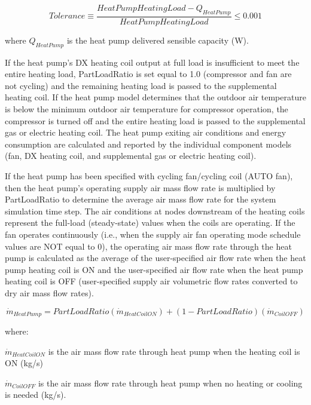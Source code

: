 \begin{equation}
  Tolerance \equiv \frac{HeatPumpHeatingLoad - Q_{HeatPump}}{HeatPumpHeatingLoad} \leq 0.001
\end{equation}

where \(Q_{HeatPump}\) is the heat pump delivered sensible capacity (W).

If the heat pump's DX heating coil output at full load is insufficient to meet the entire heating load, PartLoadRatio is set equal to 1.0 (compressor and fan are not cycling) and the remaining heating load is passed to the supplemental heating coil. If the heat pump model determines that the outdoor air temperature is below the minimum outdoor air temperature for compressor operation, the compressor is turned off and the entire heating load is passed to the supplemental gas or electric heating coil. The heat pump exiting air conditions and energy consumption are calculated and reported by the individual component models (fan, DX heating coil, and supplemental gas or electric heating coil).

If the heat pump has been specified with cycling fan/cycling coil (AUTO fan), then the heat pump's operating supply air mass flow rate is multiplied by PartLoadRatio to determine the average air mass flow rate for the system simulation time step. The air conditions at nodes downstream of the heating coils represent the full-load (steady-state) values when the coils are operating. If the fan operates continuously (i.e., when the supply air fan operating mode schedule values are NOT equal to 0), the operating air mass flow rate through the heat pump is calculated as the average of the user-specified air flow rate when the heat pump heating coil is ON and the user-specified air flow rate when the heat pump heating coil is OFF (user-specified supply air volumetric flow rates converted to dry air mass flow rates).

\begin{equation}
{\dot{m}_{HeatPump}} = PartLoadRatio\left( {\dot{m}_{HeatCoilON}} \right) + \left( {1 - PartLoadRatio} \right)\left( {\dot{m}_{CoilOFF}} \right)
\end{equation}

where:

\({\dot{m}_{HeatCoilON}}\) is the air mass flow rate through heat pump when the heating coil is ON (kg/s)

\({\dot{m}_{CoilOFF}}\) is the air mass flow rate through heat pump when no heating or cooling is needed (kg/s).

